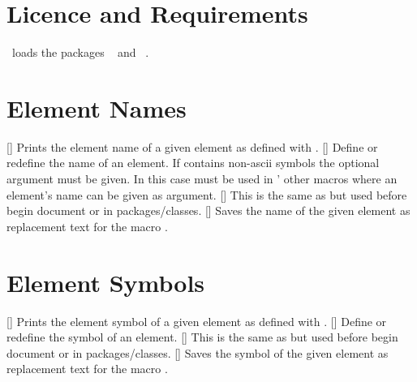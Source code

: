 \documentclass[load-preamble+]{cnltx-doc}
\begin{document}
\section{Licence and Requirements}
\license

\elements\ loads the packages ~\cite{pkg:etoolbox} and
~\cite{pkg:translations}.

\section{Element Names}

\begin{commands}
  []
    Prints the element name of a given element as defined with .
  []
    Define or redefine the name of an element.  If 
    contains non-ascii symbols the optional argument  must
    be given.  In this case  must be used in \elements'
    other macros where an element's name can be given as argument.
  []
    This is the same as  but used before begin document or in
    packages/classes.
  []
    Saves the name of the given element as replacement text for the macro
    .
\end{commands}

\begin{example}
   \par
   \par
  \saveelementname{}
  \ttfamily\meaning\foo
\end{example}

\section{Element Symbols}

\begin{commands}
  []
    Prints the element symbol of a given element as defined with .
  []
    Define or redefine the symbol of an element.
  []
    This is the same as  but used before begin document or in
    packages/classes.
  []
    Saves the symbol of the given element as replacement text for the macro
    .
\end{commands}
\end{document}
